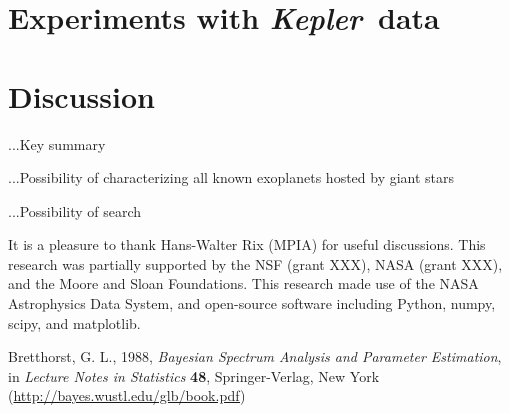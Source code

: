 \documentclass[12pt, preprint]{aastex}
\newcommand{\project}[1]{\textsl{#1}}
\newcommand{\Kepler}{\project{Kepler}}
\begin{document}
\section{Experiments with \Kepler\ data}

\section{Discussion}

...Key summary

...Possibility of characterizing all known exoplanets hosted by giant stars

...Possibility of search

\acknowledgements
It is a pleasure to thank
  Hans-Walter Rix (MPIA)
for useful discussions.
This research was partially supported by the NSF (grant XXX), NASA
(grant XXX), and the Moore and Sloan Foundations.
This research made use of the NASA Astrophysics Data System, and
open-source software including Python, numpy, scipy, and matplotlib.

\begin{thebibliography}{}\raggedright
{}
  Bretthorst, G. L., 1988,
  \textit{Bayesian Spectrum Analysis and Parameter Estimation},
  in \textit{Lecture Notes in Statistics} \textbf{48},
  Springer-Verlag, New York
  \footnotesize{(\url{http://bayes.wustl.edu/glb/book.pdf})}
\end{thebibliography}
\end{document}
